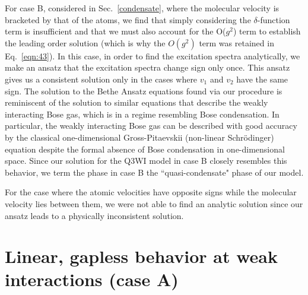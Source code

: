 \documentclass[aps,pra,
superscriptaddress,
reprint,twocolumn,preprintnumbers,
amsmath,amssymb,
nofootinbib]{revtex4-1}
\begin{document}
For case B, considered in Sec.~\ref{condensate}, where the molecular velocity is bracketed by that of the atoms, we find that simply considering the $\delta$-function term is insufficient and that we must also account for the O($g^2$) term to establish the leading order solution (which is why the $O(g^2)$ term was retained in Eq.~\eqref{eqn:43}). In this case, in order to find the excitation spectra analytically, we make an ansatz that the excitation spectra change sign only once. This ansatz gives us a consistent solution only in the cases where $v_1$ and $v_2$ have the same sign. The solution to the Bethe Ansatz equations found via our procedure is reminiscent of the solution to similar equations that describe the weakly interacting Bose gas, which is in a regime resembling Bose condensation. In particular, the weakly interacting Bose gas can be described with good accuracy by the classical one-dimensional Gross-Pitaevskii (non-linear Schr\"odinger) equation despite the formal absence of Bose condensation in one-dimensional space. Since our solution for the Q3WI model in case B closely resembles this behavior, we term the phase in case B the ``quasi-condensate" phase of our model.

For the case where the atomic velocities have opposite signs while the molecular velocity lies between them, we were not able to find an analytic solution since our ansatz leads to a physically inconsistent solution. 


        \section{Linear, gapless behavior at weak interactions (case A)}
        \label{linear}
        
\end{document}

